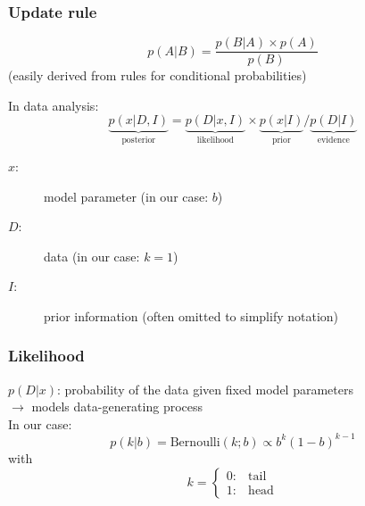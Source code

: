 \documentclass[t,aspectratio=169]{beamer}
\begin{document}
\begin{frame}
  \frametitle{Update rule}
  \begin{tcolorbox}[title=Bayes' theorem]
    \begin{equation*}
      p(A|B) = \frac{p(B|A) \times p(A)}{p(B)}
    \end{equation*}
    (easily derived from rules for conditional probabilities)
  \end{tcolorbox}
  In data analysis:
  \begin{equation*}
    \underbrace{p(x|D,I)}_{\mathrm{posterior}} = \underbrace{p(D|x,I)}_{\mathrm{likelihood}} \times \underbrace{p(x|I)}_{\mathrm{prior}} / \underbrace{p(D|I)}_{\mathrm{evidence}}
  \end{equation*}
  \begin{description}
  \item[$x$:] model parameter (in our case: $b$)
  \item[$D$:] data (in our case: $k=1$)
  \item[$I$:] prior information (often omitted to simplify notation)
  \end{description}
\end{frame}


\begin{frame}
  \frametitle{Likelihood}
  $p(D|x)$: probability of the data given fixed model parameters\\
  $\rightarrow$ models data-generating process\\
  \bigbreak
  In our case:
  \begin{equation*}
    p(k|b) = \mathrm{Bernoulli}(k;b) \propto b^k(1-b)^{k-1} 
  \end{equation*}
  with
  \begin{equation*}
    k = \begin{cases} 0:& \mathrm{tail}\\
      1:& \mathrm{head}
    \end{cases}
  \end{equation*}
  \vfill
  \centering
\end{frame}
\end{document}
